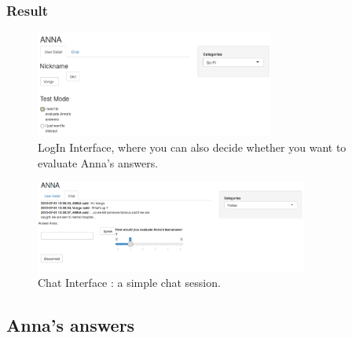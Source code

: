 \newpage
\subsubsection{Result}
\label{subs:Result}

\begin{figure}[!h]
\begin{center}
\includegraphics[width=0.70\textwidth]{./img/AnnaLoginUI.png}
\end{center}
\caption{LogIn Interface, where you can also decide whether you want to evaluate Anna's answers.}
\label{fig:AnnaLoginUI}
\end{figure}

\begin{figure}[!h]
\begin{center}
\includegraphics[width=0.80\textwidth]{./img/AnnaChatUI.png}
\end{center}
\caption{Chat Interface : a simple chat session.}
\label{fig:AnnaChatUI}
\end{figure}


%
\subsection{Anna's answers}
\label{sub:Answering}

